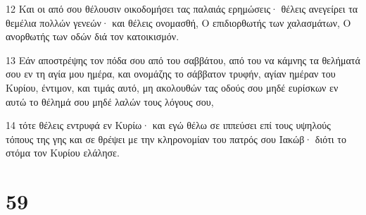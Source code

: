 \par 12 Και οι από σου θέλουσιν οικοδομήσει τας παλαιάς ερημώσεις· θέλεις ανεγείρει τα θεμέλια πολλών γενεών· και θέλεις ονομασθή, Ο επιδιορθωτής των χαλασμάτων, Ο ανορθωτής των οδών διά τον κατοικισμόν.
\par 13 Εάν αποστρέψης τον πόδα σου από του σαββάτου, από του να κάμνης τα θελήματά σου εν τη αγία μου ημέρα, και ονομάζης το σάββατον τρυφήν, αγίαν ημέραν του Κυρίου, έντιμον, και τιμάς αυτό, μη ακολουθών τας οδούς σου μηδέ ευρίσκων εν αυτώ το θέλημά σου μηδέ λαλών τους λόγους σου,
\par 14 τότε θέλεις εντρυφά εν Κυρίω· και εγώ θέλω σε ιππεύσει επί τους υψηλούς τόπους της γης και σε θρέψει με την κληρονομίαν του πατρός σου Ιακώβ· διότι το στόμα τον Κυρίου ελάλησε.

\chapter{59}

